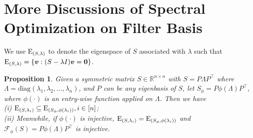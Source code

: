 \documentclass[nohyperref]{article}
\theoremstyle{plain}
\newtheorem{proposition}[theorem]{Proposition}
\theoremstyle{definition}
\theoremstyle{remark}
\begin{document}
\section{More Discussions of Spectral Optimization on Filter Basis}
\label{more_filter_basis}

We use $\textrm E_{(S, \lambda)}$ to denote the eigenspace of $S$ associated with $\lambda$ such that $\textrm E_{(S, \lambda)}=\{\bm v: (S-\lambda I)\bm v=\bm 0\}$.

\begin{proposition}
	\label{prop:eig_mapping}
	Given a symmetric matrix $S\in\mathbb R^{n\times n}$ with $S=P\Lambda P^{\top}$ where $\Lambda=\textrm{diag}(\lambda_1, \lambda_2, \dots, \lambda_n)$, and $P$ can be any eigenbasis of $S$,
	let $S_{\phi}=P\phi(\Lambda)P^{\top}$, where $\phi(\cdot)$ is an entry-wise function applied on $\Lambda$. Then we have \\
	(i) $\textrm E_{(S, \lambda_i)}\subseteq\textrm E_{(S_{\phi}, \phi(\lambda_i))}, i\in[n]$; \\
	(ii) Meanwhile, if $\phi(\cdot)$ is injective, $\textrm E_{(S, \lambda_i)}=\textrm E_{(S_{\phi}, \phi(\lambda_i))}$ and $\mathcal F_{\phi}(S)=P\phi(\Lambda)P^{\top}$ is injective.
\end{proposition}
\end{document}
